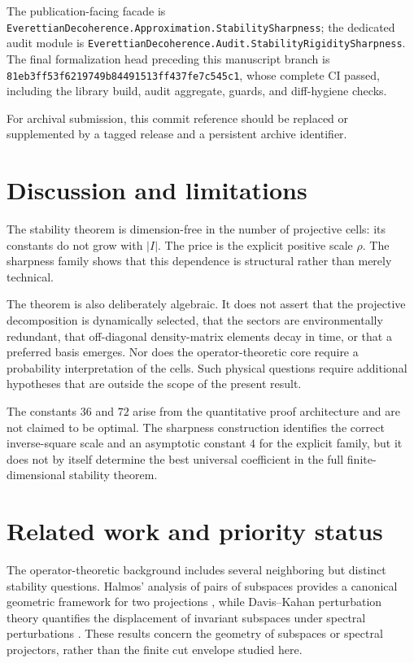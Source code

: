 \documentclass[11pt]{article}
\begin{document}
The publication-facing facade is
\texttt{EverettianDecoherence.Approximation.StabilitySharpness}; the dedicated
audit module is
\texttt{EverettianDecoherence.Audit.StabilityRigiditySharpness}.
The final formalization head preceding this manuscript branch is
\texttt{81eb3ff53f6219749b84491513ff437fe7c545c1}, whose complete CI passed,
including the library build, audit aggregate, guards, and diff-hygiene checks.

For archival submission, this commit reference should be replaced or
supplemented by a tagged release and a persistent archive identifier.

\section{Discussion and limitations}

The stability theorem is dimension-free in the number of projective cells:
its constants do not grow with $|I|$.  The price is the explicit positive
scale $\rho$.  The sharpness family shows that this dependence is structural
rather than merely technical.

The theorem is also deliberately algebraic.  It does not assert that the
projective decomposition is dynamically selected, that the sectors are
environmentally redundant, that off-diagonal density-matrix elements decay
in time, or that a preferred basis emerges.  Nor does the operator-theoretic
core require a probability interpretation of the cells.  Such physical
questions require additional hypotheses that are outside the scope of the
present result.

The constants $36$ and $72$ arise from the quantitative proof architecture
and are not claimed to be optimal.  The sharpness construction identifies the
correct inverse-square scale and an asymptotic constant $4$ for the explicit
family, but it does not by itself determine the best universal coefficient in
the full finite-dimensional stability theorem.

\section{Related work and priority status}

The operator-theoretic background includes several neighboring but distinct
stability questions.  Halmos' analysis of pairs of subspaces provides a
canonical geometric framework for two projections
\cite{Halmos1969TwoSubspaces}, while Davis--Kahan perturbation theory
quantifies the displacement of invariant subspaces under spectral
perturbations \cite{DavisKahan1970}.  These results concern the geometry of
subspaces or spectral projectors, rather than the finite cut envelope studied
here.
\end{document}
